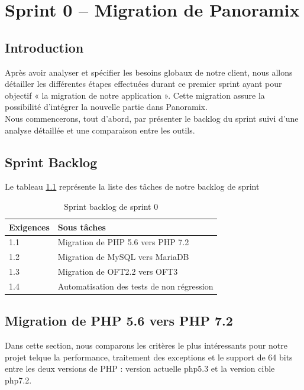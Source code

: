 \chapter{Sprint 0 – Migration de Panoramix}

\section*{Introduction}
Après avoir analyser et spécifier les besoins globaux de notre client, nous allons détailler les différentes étapes effectuées durant ce premier sprint ayant pour objectif « la migration de notre application ».  Cette migration assure la possibilité d’intégrer la nouvelle partie dans Panoramix.\\
Nous commencerons, tout d’abord, par présenter le backlog du sprint suivi d’une analyse détaillée et une comparaison entre les outils.

\section[Sprint Backlog]{Sprint Backlog}
Le tableau \ref{tab:sprint-backlog-sprint0} représente la liste des tâches de notre backlog de sprint
\begin{table}[H]
	\centering
	\begin{tabular}{|l|l|}
		\hline
		\rowcolor[HTML]{C0C0C0} 
		Exigences & Sous tâches                           \\ \hline
		1.1      & Migration de PHP 5.6 vers PHP 7.2    \\ \hline
		1.2      & Migration de MySQL vers MariaDB      \\ \hline
		1.3      & Migration de OFT2.2 vers OFT3        \\ \hline
		1.4      & Automatisation des tests de non régression \\ \hline
	\end{tabular}
	\captionsetup{justification=centering}
	\caption{Sprint backlog de sprint 0}
	\label{tab:sprint-backlog-sprint0}
\end{table}

\section[Migration de PHP 5.6 vers PHP 7.2]{Migration de PHP 5.6 vers PHP 7.2}
Dans cette section, nous comparons les critères le plus intéressants pour notre projet telque la performance, traitement des exceptions et le support de 64 bits entre les deux versions de PHP : version actuelle php5.3 et la version cible php7.2.

